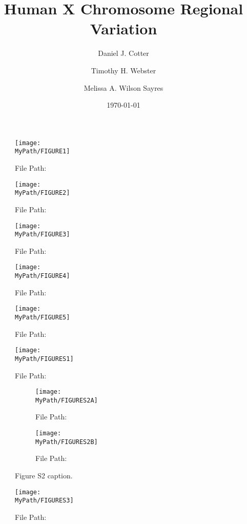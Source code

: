\documentclass[12pt]{article}
\title{Human X Chromosome Regional Variation}
\author[1]{Daniel J. Cotter}
\author[1]{Timothy H. Webster}
\author[1]{Melissa A. Wilson Sayres}
\affil[1]{Arizona State University}
\date{\today}
\newcommand*{\MyPath}{..}
\newcommand{\beginsupplement}{%
        \setcounter{table}{0}
        \renewcommand{\thetable}{S\arabic{table}}%
        \setcounter{figure}{0}
        \renewcommand{\thefigure}{S\arabic{figure}}%
     }
\begin{document}
\maketitle

\begin{abstract}

\end{abstract}

\begin{figure}
  \texttt{[image: \\MyPath/FIGURE1]}
  \caption{File Path: \texttt{}}
  \label{fig:fig1}
\end{figure}

\begin{figure}
  \texttt{[image: \\MyPath/FIGURE2]}
  \caption{File Path: \texttt{}}
  \label{fig:fig2}
\end{figure}

\begin{figure}
  \texttt{[image: \\MyPath/FIGURE3]}
  \caption{File Path: \texttt{}}
  \label{fig:fig3}
\end{figure}

\begin{figure}
  \texttt{[image: \\MyPath/FIGURE4]}
  \caption{File Path: \texttt{}}
  \label{fig:fig4}
\end{figure}

\begin{figure}
  \texttt{[image: \\MyPath/FIGURE5]}
  \caption{File Path: \texttt{}}
  \label{fig:fig5}
\end{figure}

\beginsupplement

\begin{figure}
  \texttt{[image: \\MyPath/FIGURES1]}
  \caption{File Path: \texttt{}}
  \label{fig:figS1}
\end{figure}

\begin{figure}[h!]
  \centering
  \begin{subfigure}[b]{0.4\linewidth}
    \texttt{[image: \\MyPath/FIGURES2A]}
    \caption{File Path: \texttt{}}
  \end{subfigure}
  \begin{subfigure}[b]{0.4\linewidth}
    \texttt{[image: \\MyPath/FIGURES2B]}
    \caption{File Path: \texttt{}}
  \end{subfigure}
  \caption{Figure S2 caption.}
  \label{fig:figS2}
\end{figure}

\begin{figure}
  \texttt{[image: \\MyPath/FIGURES3]}
  \caption{File Path: \texttt{}}
  \label{fig:figS3}
\end{figure}
\end{document}
